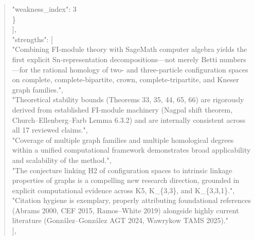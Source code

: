 \documentclass[11pt]{article}
\begin{document}
\begin{quote}
      "weakness\_index": 3\\
    \}\\
  ],\\
  "strengths": [\\
    "Combining FI-module theory with SageMath computer algebra yields the first explicit Sn-representation decompositions---not merely Betti numbers---for the rational homology of two- and three-particle configuration spaces on complete, complete-bipartite, crown, complete-tripartite, and Kneser graph families.",\\
    "Theoretical stability bounds (Theorems 33, 35, 44, 65, 66) are rigorously derived from established FI-module machinery (Nagpal shift theorem, Church--Ellenberg--Farb Lemma 6.3.2) and are internally consistent across all 17 reviewed claims.",\\
    "Coverage of multiple graph families and multiple homological degrees within a unified computational framework demonstrates broad applicability and scalability of the method.",\\
    "The conjecture linking H2 of configuration spaces to intrinsic linkage properties of graphs is a compelling new research direction, grounded in explicit computational evidence across K5, K\_\{3,3\}, and K\_\{3,3,1\}.",\\
    "Citation hygiene is exemplary, properly attributing foundational references (Abrams 2000, CEF 2015, Ramos--White 2019) alongside highly current literature (González--González AGT 2024, Wawrykow TAMS 2025)."\\
  ],\\

\end{quote}
\end{document}

